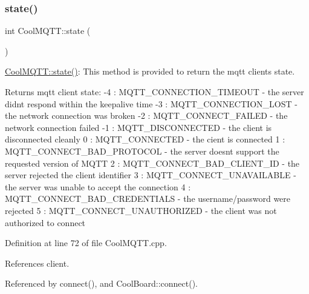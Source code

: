\subsubsection{\texorpdfstring{state()}{state()}}
{\footnotesize\ttfamily int Cool\+M\+Q\+T\+T\+::state (\begin{DoxyParamCaption}{ }\end{DoxyParamCaption})}

\hyperlink{classCoolMQTT_a5d003307eff78efbd585e42b43b72b6d}{Cool\+M\+Q\+T\+T\+::state()}\+: This method is provided to return the mqtt client\textquotesingle{}s state. \begin{DoxyReturn}{Returns}
mqtt client state\+: -\/4 \+: M\+Q\+T\+T\+\_\+\+C\+O\+N\+N\+E\+C\+T\+I\+O\+N\+\_\+\+T\+I\+M\+E\+O\+UT -\/ the server didn\textquotesingle{}t respond within the keepalive time -\/3 \+: M\+Q\+T\+T\+\_\+\+C\+O\+N\+N\+E\+C\+T\+I\+O\+N\+\_\+\+L\+O\+ST -\/ the network connection was broken -\/2 \+: M\+Q\+T\+T\+\_\+\+C\+O\+N\+N\+E\+C\+T\+\_\+\+F\+A\+I\+L\+ED -\/ the network connection failed -\/1 \+: M\+Q\+T\+T\+\_\+\+D\+I\+S\+C\+O\+N\+N\+E\+C\+T\+ED -\/ the client is disconnected cleanly 0 \+: M\+Q\+T\+T\+\_\+\+C\+O\+N\+N\+E\+C\+T\+ED -\/ the cient is connected 1 \+: M\+Q\+T\+T\+\_\+\+C\+O\+N\+N\+E\+C\+T\+\_\+\+B\+A\+D\+\_\+\+P\+R\+O\+T\+O\+C\+OL -\/ the server doesn\textquotesingle{}t support the requested version of M\+Q\+TT 2 \+: M\+Q\+T\+T\+\_\+\+C\+O\+N\+N\+E\+C\+T\+\_\+\+B\+A\+D\+\_\+\+C\+L\+I\+E\+N\+T\+\_\+\+ID -\/ the server rejected the client identifier 3 \+: M\+Q\+T\+T\+\_\+\+C\+O\+N\+N\+E\+C\+T\+\_\+\+U\+N\+A\+V\+A\+I\+L\+A\+B\+LE -\/ the server was unable to accept the connection 4 \+: M\+Q\+T\+T\+\_\+\+C\+O\+N\+N\+E\+C\+T\+\_\+\+B\+A\+D\+\_\+\+C\+R\+E\+D\+E\+N\+T\+I\+A\+LS -\/ the username/password were rejected 5 \+: M\+Q\+T\+T\+\_\+\+C\+O\+N\+N\+E\+C\+T\+\_\+\+U\+N\+A\+U\+T\+H\+O\+R\+I\+Z\+ED -\/ the client was not authorized to connect 
\end{DoxyReturn}


Definition at line 72 of file Cool\+M\+Q\+T\+T.\+cpp.



References client.



Referenced by connect(), and Cool\+Board\+::connect().


